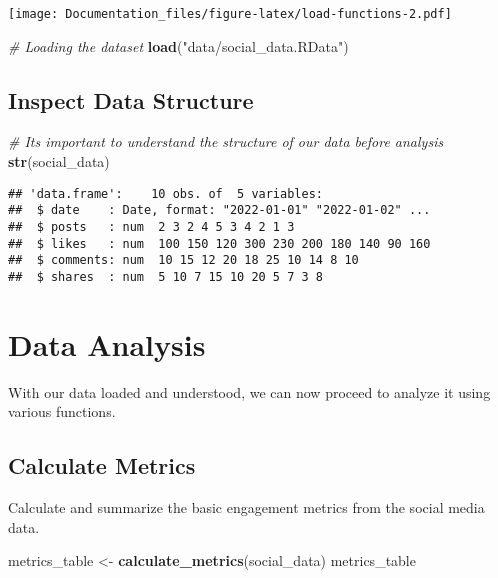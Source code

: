 \documentclass[
]{article}
\newenvironment{Shaded}{\begin{snugshade}}{\end{snugshade}}
\newcommand{\CommentTok}[1]{\textcolor[rgb]{0.56,0.35,0.01}{\textit{#1}}}
\newcommand{\FunctionTok}[1]{\textcolor[rgb]{0.13,0.29,0.53}{\textbf{#1}}}
\newcommand{\NormalTok}[1]{#1}
\newcommand{\OtherTok}[1]{\textcolor[rgb]{0.56,0.35,0.01}{#1}}
\newcommand{\StringTok}[1]{\textcolor[rgb]{0.31,0.60,0.02}{#1}}
\begin{document}
\texttt{[image: Documentation\_files/figure-latex/load-functions-2.pdf]}

\begin{Shaded}
\begin{Highlighting}[]
\CommentTok{\# Loading the dataset}
\FunctionTok{load}\NormalTok{(}\StringTok{"data/social\_data.RData"}\NormalTok{)}
\end{Highlighting}
\end{Shaded}

\hypertarget{inspect-data-structure}{%
\subsection{Inspect Data Structure}\label{inspect-data-structure}}

\begin{Shaded}
\begin{Highlighting}[]
\CommentTok{\# It\textquotesingle{}s important to understand the structure of our data before analysis}
\FunctionTok{str}\NormalTok{(social\_data)}
\end{Highlighting}
\end{Shaded}

\begin{verbatim}
## 'data.frame':    10 obs. of  5 variables:
##  $ date    : Date, format: "2022-01-01" "2022-01-02" ...
##  $ posts   : num  2 3 2 4 5 3 4 2 1 3
##  $ likes   : num  100 150 120 300 230 200 180 140 90 160
##  $ comments: num  10 15 12 20 18 25 10 14 8 10
##  $ shares  : num  5 10 7 15 10 20 5 7 3 8
\end{verbatim}

\hypertarget{data-analysis}{%
\section{Data Analysis}\label{data-analysis}}

With our data loaded and understood, we can now proceed to analyze it
using various functions.

\hypertarget{calculate-metrics}{%
\subsection{Calculate Metrics}\label{calculate-metrics}}

Calculate and summarize the basic engagement metrics from the social
media data.

\begin{Shaded}
\begin{Highlighting}[]
\NormalTok{metrics\_table }\OtherTok{\textless{}{-}} \FunctionTok{calculate\_metrics}\NormalTok{(social\_data)}
\NormalTok{metrics\_table}
\end{Highlighting}
\end{Shaded}
\end{document}
